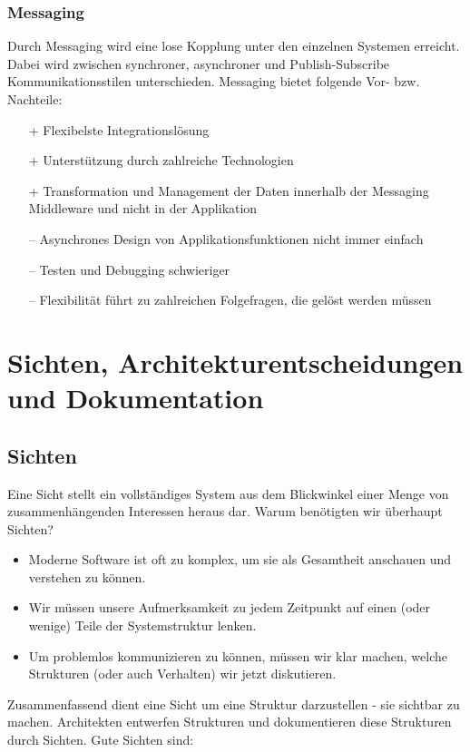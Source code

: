 \subsubsection{Messaging}

Durch Messaging wird eine lose Kopplung unter den einzelnen Systemen erreicht. Dabei wird zwischen synchroner, asynchroner und Publish-Subscribe Kommunikationsstilen unterschieden. Messaging bietet folgende Vor- bzw. Nachteile:
\begin{itemize}
	\item[+] Flexibelste Integrationslösung
	\item[+] Unterstützung durch zahlreiche Technologien
	\item[+] Transformation und Management der Daten innerhalb der Messaging Middleware und nicht in der Applikation
	\item[--] Asynchrones Design von Applikationsfunktionen nicht immer einfach
	\item[--] Testen und Debugging schwieriger
	\item[--] Flexibilität führt zu zahlreichen Folgefragen, die gelöst werden müssen
\end{itemize}

\section{Sichten, Architekturentscheidungen und Dokumentation}

\subsection{Sichten}

Eine Sicht stellt ein vollständiges System aus dem Blickwinkel einer Menge von zusammenhängenden Interessen heraus dar. Warum benötigten wir überhaupt Sichten?

\begin{itemize}
	\item Moderne Software ist oft zu komplex, um sie als Gesamtheit anschauen und verstehen zu können.
	\item Wir müssen unsere Aufmerksamkeit zu jedem Zeitpunkt auf einen (oder wenige) Teile der Systemstruktur lenken.
	\item Um problemlos kommunizieren zu können, müssen wir klar machen, welche Strukturen (oder auch Verhalten) wir jetzt diskutieren.
\end{itemize}

Zusammenfassend dient eine Sicht um eine Struktur darzustellen - sie sichtbar zu machen. Architekten entwerfen Strukturen und dokumentieren diese Strukturen durch Sichten. Gute Sichten sind:


